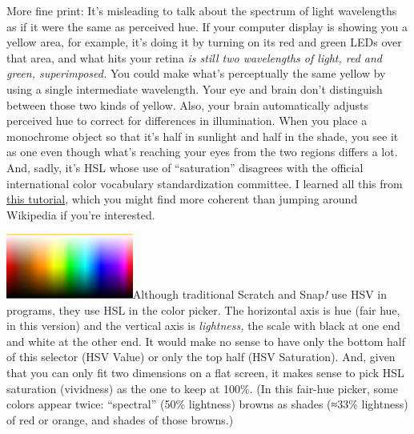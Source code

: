 More fine print: It's misleading to talk about the spectrum of light
wavelengths as if it were the same as perceived hue. If your computer
display is showing you a yellow area, for example, it's doing it by
turning on its red and green LEDs over that area, and what hits your
retina \emph{is still two wavelengths of light, red and green,
superimposed.} You could make what's perceptually the same yellow by
using a single intermediate wavelength. Your eye and brain don't
distinguish between those two kinds of yellow. Also, your brain
automatically adjusts perceived hue to correct for differences in
illumination. When you place a monochrome object so that it's half in
sunlight and half in the shade, you see it as one even though what's
reaching your eyes from the two regions differs a lot. And, sadly, it's
HSL whose use of ``saturation'' disagrees with the official
international color vocabulary standardization committee. I learned all
this from \href{http://www.huevaluechroma.com/011.php}{this tutorial},
which you might find more coherent than jumping around Wikipedia if
you're interested.

\includegraphics[width=1.64375in,height=0.84167in]{media/image1204.png}Although
traditional Scratch and Snap\emph{!} use HSV in programs, they use HSL
in the color picker. The horizontal axis is hue (fair hue, in this
version) and the vertical axis is \emph{lightness,} the scale with black
at one end and white at the other end. It would make no sense to have
only the bottom half of this selector (HSV Value) or only the top half
(HSV Saturation). And, given that you can only fit two dimensions on a
flat screen, it makes sense to pick HSL saturation (vividness) as the
one to keep at 100\%. (In this fair-hue picker, some colors appear
twice: ``spectral'' (50\% lightness) browns as shades (≈33\% lightness)
of red or orange, and shades of those browns.)

